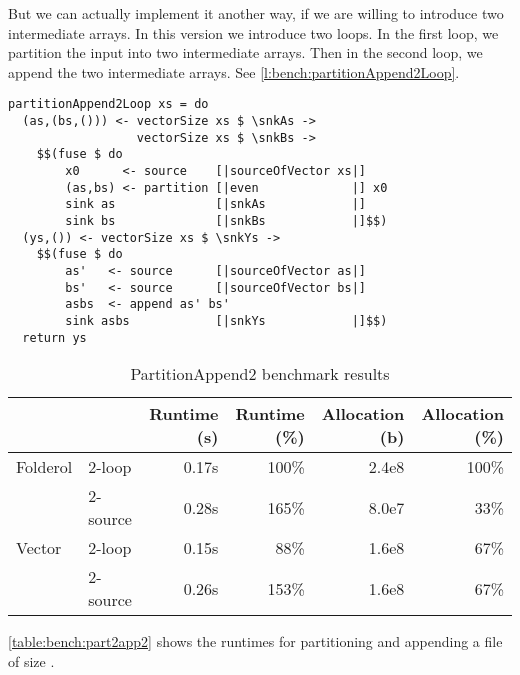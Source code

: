 But we can actually implement it another way, if we are willing to introduce two intermediate arrays.
In this version we introduce two loops.
In the first loop, we partition the input into two intermediate arrays.
Then in the second loop, we append the two intermediate arrays.
See \autoref{l:bench:partitionAppend2Loop}.

\begin{lstlisting}[float,label=l:bench:partitionAppend2Loop,caption=Partition / append with two loops]
partitionAppend2Loop xs = do
  (as,(bs,())) <- vectorSize xs $ \snkAs ->
                  vectorSize xs $ \snkBs ->
    $$(fuse $ do
        x0      <- source    [|sourceOfVector xs|]
        (as,bs) <- partition [|even             |] x0
        sink as              [|snkAs            |]
        sink bs              [|snkBs            |]$$)
  (ys,()) <- vectorSize xs $ \snkYs ->
    $$(fuse $ do
        as'   <- source      [|sourceOfVector as|]
        bs'   <- source      [|sourceOfVector bs|]
        asbs  <- append as' bs'
        sink asbs            [|snkYs            |]$$)
  return ys
\end{lstlisting}

\begin{table}
\begin{center}
\begin{tabular}{ll|rrrr}
& & Runtime (s)  & Runtime (\%) & Allocation (b) & Allocation (\%) \\
\hline
Folderol & 2-loop   & 0.17s &   100\% & 2.4e8 & 100\% \\
         & 2-source & 0.28s &   165\% & 8.0e7 &  33\% \\
Vector   & 2-loop   & 0.15s &    88\% & 1.6e8 &  67\% \\
         & 2-source & 0.26s &   153\% & 1.6e8 &  67\% \\
\end{tabular}
\end{center}
\caption[PartitionAppend2 benchmark results]{PartitionAppend2 benchmark results}
\label{table:bench:part2app2}
\end{table}

\autoref{table:bench:part2app2} shows the runtimes for partitioning and appending a file of size .

